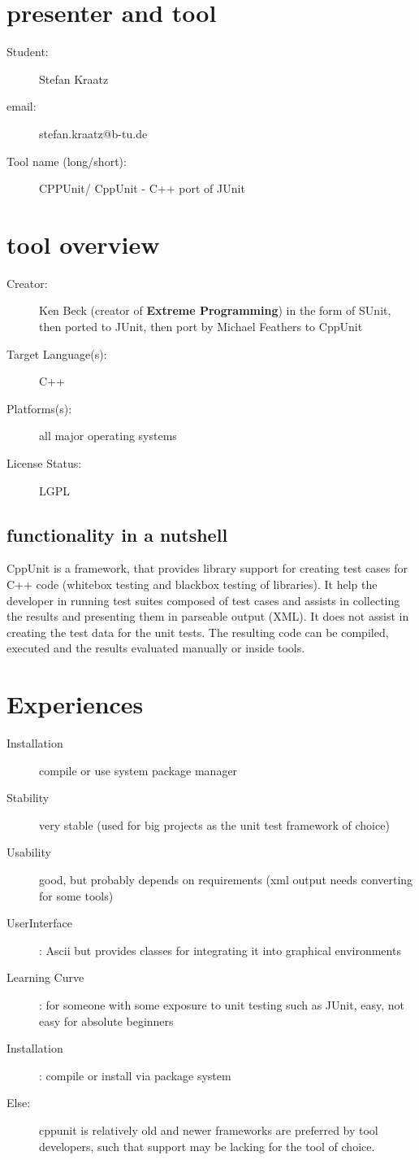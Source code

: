\documentclass[10pt,a4paper,onecolumn,notitlepage]{article}
\author{Stefan Kraatz}
\begin{document}
\section*{presenter and tool}
\begin{description}
\item[Student:] Stefan Kraatz 
\item[email:] stefan.kraatz@b-tu.de
\item[Tool name (long/short):] CPPUnit/ CppUnit - C++ port of JUnit
\end{description}
\section*{tool overview}
\begin{description}
\item[Creator:] Ken Beck (creator of \textbf{Extreme Programming}) in the form of SUnit, then ported to JUnit, then port by Michael Feathers to CppUnit
\item[Target Language(s):] C++
\item[Platforms(s):] all major operating systems
\item[License Status:] LGPL
\end{description}
\subsection*{functionality in a nutshell}
CppUnit is a framework, that provides library support for creating test cases for C++ code (whitebox testing and blackbox testing of libraries). It help the developer in running test suites composed of test cases and assists in collecting the results and presenting them in parseable output (XML). It does not assist in creating the test data for the unit tests. The resulting code can be compiled, executed and the results evaluated manually or inside tools.
\section*{Experiences}
\begin{description}
\item[Installation] compile or use system package manager
\item[Stability] very stable (used for big projects as the unit test framework of choice)
\item[Usability] good, but probably depends on requirements (xml output needs converting for some tools)
\item[UserInterface]: Ascii but provides classes for integrating it into graphical environments
\item[Learning Curve]: for someone with some exposure to unit testing such as JUnit, easy, not easy for absolute beginners 
\item[Installation] : compile or install via package system
\item[Else:] cppunit is relatively old and newer frameworks are preferred by tool developers, such that support may be lacking for the tool of choice. 
\end{description}
\end{document}
